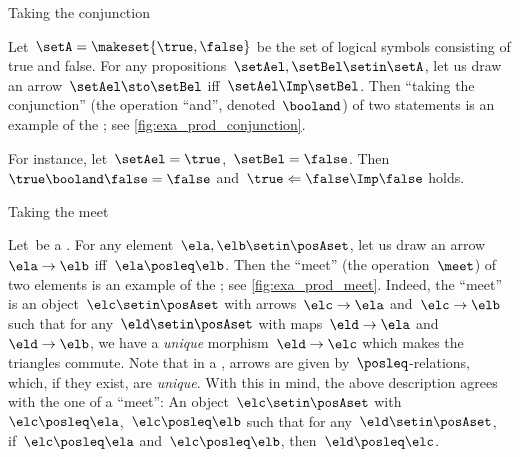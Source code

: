 \begin{marginfigure}
    \centering
    \caption{Taking the conjunction}
    \label{fig:exa_prod_conjunction}
\end{marginfigure}

\begin{example}
    \label{exa:conjunction-as-prod}
    Let~$\setA = \makeset{ \true, \false }$ be the set of logical symbols consisting of true and false.
    For any propositions~$\setAel, \setBel  \setin \setA$, let us draw an arrow~$\setAel \sto \setBel$ iff~$\setAel \Imp \setBel$.
    Then ``taking the conjunction'' (the operation ``and'', denoted~$\booland$) of two statements is an example of the ; see \cref{fig:exa_prod_conjunction}.

    For instance, let~$\setAel = \true$,~$\setBel = \false$.
    Then~$\true \booland \false = \false$ and~$\true \Leftarrow \false \Imp \false$ holds.
\end{example}

\begin{marginfigure}
    \centering
    \caption{Taking the meet}
    \label{fig:exa_prod_meet}
\end{marginfigure}

\begin{example}
    \label{exa:meet-as-prod}
    Let~\posA be a .
    For any element~$\ela, \elb \setin \posAset$, let us draw an arrow~$\ela \to \elb$ iff~$\ela \posleq \elb$.
    Then the ``meet'' (the operation~$\meet$) of two elements is an example of the ; see \cref{fig:exa_prod_meet}.
    Indeed, the ``meet'' is an object~$\elc \setin \posAset$ with arrows~$\elc\to \ela$ and~$\elc \to \elb$ such that for any~$\eld\setin \posAset$ with maps~$\eld\to \ela$ and~$\eld\to \elb$, we have a \emph{unique} morphism~$\eld\to \elc$ which makes the triangles commute.
    Note that in a , arrows are given by~$\posleq$-relations, which, if they exist, are \emph{unique}.
    With this in mind, the above description agrees with the one of a ``meet'':
    An object~$\elc\setin \posAset$ with $\elc\posleq \ela$,~$\elc\posleq \elb$ such that for any~$\eld\setin \posAset$, if~$\elc\posleq \ela$ and~$\elc\posleq \elb$, then~$\eld\posleq \elc$.
\end{example}

\begin{marginfigure}
    \centering
    \caption{}
    \label{fig:prod_generic}
\end{marginfigure}

